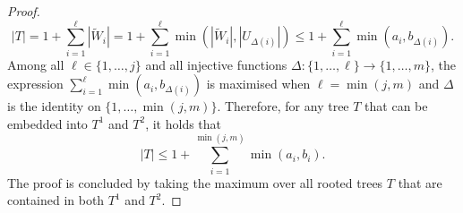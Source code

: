 \documentclass[11pt]{article}
\numberwithin{equation}{section}
\theoremstyle{definition}
\begin{document}
\begin{proof}
\begin{equation*}
        |T| = 1 + \sum_{i=1}^{\ell} |\widetilde{W}_i|
        = 1 + \sum_{i=1}^{\ell} \min(|\widetilde{W}_i|, |U_{\Delta(i)}|)
        \leq
        1 + \sum_{i=1}^{\ell} \min(a_i, b_{\Delta(i)}).
    \end{equation*}
    Among all $\ell \in \{1,\ldots,j\}$ and all injective functions $\Delta: \{1,\ldots,\ell \} \to \{1,\ldots, m\}$, the expression $\sum_{i=1}^{\ell} \min(a_i, b_{\Delta(i)})$ is maximised when $\ell = \min(j,m)$ and $\Delta$ is the identity on $\{1,\ldots,\min(j,m)\}$. Therefore, for any tree $T$ that can be embedded into $T^1$ and $T^2$, it holds that
    \begin{equation*}
        |T| 
        \leq
        1 + \sum_{i=1}^{\min(j,m)} \min(a_i, b_{i}).
    \end{equation*}
   The proof is concluded by taking the maximum over all rooted trees $T$ that are contained in both $T^1$ and $T^2$.
\end{proof}
\end{document}
